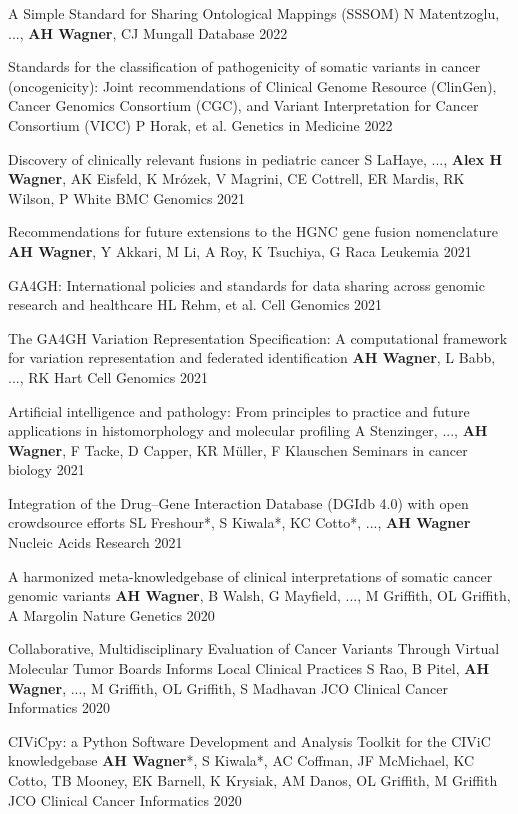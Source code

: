 \pub
{A Simple Standard for Sharing Ontological Mappings (SSSOM)}
{N Matentzoglu, ..., {\bf AH Wagner}, CJ Mungall}
{Database}
{2022}

\pub
{Standards for the classification of pathogenicity of somatic variants in cancer (oncogenicity): Joint recommendations of Clinical Genome Resource (ClinGen), Cancer Genomics Consortium (CGC), and Variant Interpretation for Cancer Consortium (VICC)}
{P Horak, et al.}
{Genetics in Medicine}
{2022}

\pub
{Discovery of clinically relevant fusions in pediatric cancer}
{S LaHaye, ..., {\bf Alex H Wagner}, AK Eisfeld, K Mrózek, V Magrini, CE Cottrell, ER Mardis, RK Wilson, P White}
{BMC Genomics}
{2021}

\pub
{Recommendations for future extensions to the HGNC gene fusion nomenclature}
{{\bf AH Wagner}, Y Akkari, M Li, A Roy, K Tsuchiya, G Raca}
{Leukemia}
{2021}

\pub
{GA4GH: International policies and standards for data sharing across genomic research and healthcare}
{HL Rehm, et al.}
{Cell Genomics}
{2021}

\pub
{The GA4GH Variation Representation Specification: A computational framework for variation representation and federated identification}
{{\bf AH Wagner}, L Babb, ..., RK Hart}
{Cell Genomics}
{2021}

\pub
{Artificial intelligence and pathology: From principles to practice and future applications in histomorphology and molecular profiling}
{A Stenzinger, ..., {\bf AH Wagner}, F Tacke, D Capper, KR Müller, F Klauschen}
{Seminars in cancer biology}
{2021}

\pub
{Integration of the Drug–Gene Interaction Database (DGIdb 4.0) with open crowdsource efforts}
{SL Freshour*, S Kiwala*, KC Cotto*, ..., {\bf AH Wagner}}
{Nucleic Acids Research}
{2021}

\pub
{A harmonized meta-knowledgebase of clinical interpretations of somatic cancer genomic variants}
{{\bf AH Wagner}, B Walsh, G Mayfield, ..., M Griffith, OL Griffith, A Margolin}
{Nature Genetics}
{2020}

\pub
{Collaborative, Multidisciplinary Evaluation of Cancer Variants Through Virtual Molecular Tumor Boards Informs Local Clinical Practices}
{S Rao, B Pitel, {\bf AH Wagner}, ..., M Griffith, OL Griffith, S Madhavan}
{JCO Clinical Cancer Informatics}
{2020}

\pub
{CIViCpy: a Python Software Development and Analysis Toolkit for the CIViC knowledgebase}
{{\bf AH Wagner}*, S Kiwala*, AC Coffman, JF McMichael, KC Cotto, TB Mooney, EK Barnell, K Krysiak, AM Danos, OL Griffith, M Griffith}
{JCO Clinical Cancer Informatics}
{2020}

